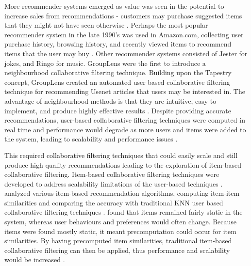 More recommender systems emerged as value was seen in the potential to increase sales from recommendations - customers may purchase suggested items that they might not have seen otherwise \cite{schafer2007collaborative}. Perhaps the most popular recommender system in the late 1990's was used in Amazon.com, collecting user purchase history, browsing history, and recently viewed items to recommend items that the user may buy \cite{schafer2007collaborative}. Other recommender systems consisted of Jester \cite{goldberg} for jokes, and Ringo \cite{ringo} for music.
GroupLens \cite{grouplens} were the first to introduce a neighbourhood collaborative filtering technique. Building upon the Tapestry concept, GroupLens created an automated user based collaborative filtering technique for recommending Usenet articles that users may be interested in. The advantage of neighbourhood methods is that they are intuitive, easy to implement, and produce highly effective results \cite{survey, scalable}. Despite providing accurate recommendations, user-based collaborative filtering techniques were computed in real time and performance would degrade as more users and items were added to the system, leading to scalability and performance issues \cite{dimension, itembased, evaluationitem}.

This required collaborative filtering techniques that could easily scale and still produce high quality recommendations leading to the exploration of item-based collaborative filtering. Item-based collaborative filtering techniques were developed to address scalability limitations of the user-based techniques \cite{survey}. \citeauthor{itembased} analyzed various item-based recommendation algorithms, computing item-item similarities and comparing the accuracy with traditional KNN user based collaborative filtering techniques \cite{itembased}. \citeauthor{itembased} found that items remained fairly static in the system, whereas user behaviours and preferences would often change. Because items were found mostly static, it meant precomputation could occur for item similarities. By having precomputed item similarities, traditional item-based collaborative filtering can then be applied, thus performance and scalability would be increased \cite{scalable}.

